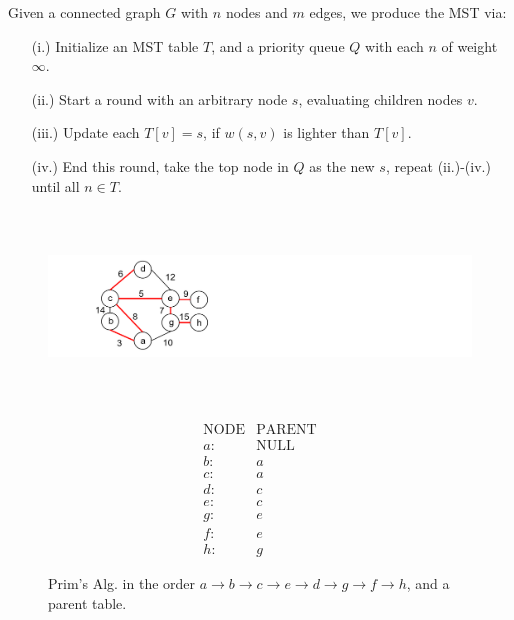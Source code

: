 \vspace{-1em}
\begin{theo}

    Given a connected graph $G$ with $n$ nodes and $m$ edges, we produce the MST via:
    \begin{enumerate}
        \item [(i.)] Initialize an MST table $T$, and a priority queue $Q$ with each $n$ of weight $\infty$.
        \item [(ii.)] Start a round with an arbitrary node $s$, evaluating children nodes $v$.
        \item [(iii.)] Update each $T[v]=s$, if $w(s,v)$ is lighter than $T[v]$.
        \item [(iv.)] End this round, take the top node in $Q$ as the new $s$, repeat (ii.)-(iv.) until all $n\in T$.
    \end{enumerate}
    \noindent

\end{theo}

\vspace{-2em}
\begin{figure}[h]
    \centering
    \hfill
    \begin{minipage}{0.45\textwidth}
        \centering

        \vspace{2em}
      
        \includegraphics[height=2in]{./Sections/spanning/prims_order.png}
        
    \end{minipage}%
    \hfill
    \begin{minipage}{0.45\textwidth}
        \centering

        \vspace{2em}
        $$ \begin{matrix} 
        \text{NODE} & \text{PARENT}\\
        a: & \text{NULL}\\ 
        b: & a\\ 
        c: & a\\ 
        d: & c\\ 
        e: & c\\ 
        g: & e\\ 
        f: & e\\ 
        h: & g 
        \end{matrix} $$
    \end{minipage}
    \hfill 
    \caption{Prim's Alg. in the order $a\to b \to c \to e \to d \to g \to f \to h$, and a parent table.}
    \label{fig:prim_example}
\end{figure}

